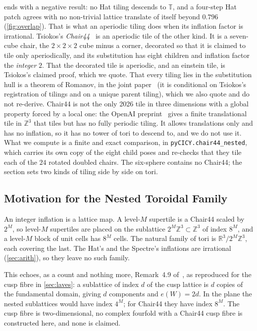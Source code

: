 \documentclass[11pt,a4paper]{article}
\newcommand{\ZZ}{\mathbb{Z}}
\newcommand{\RR}{\mathbb{R}}
\newcommand{\TT}{\mathbb{T}}
\theoremstyle{plain}
\theoremstyle{definition}
\begin{document}
 ends with a negative result: no Hat tiling descends to $\TT$,
and a four-step Hat patch agrees with no non-trivial lattice translate of itself
beyond $0.796$ (\cref{fig:overlap}). That is what an aperiodic tiling does when
its inflation factor is irrational. Tsiokos's \emph{Chair44}~\cite{Tsiokos1}
is an aperiodic tile of the other kind. It is a seven-cube chair, the
$2\times2\times2$ cube minus a corner, decorated so that it is claimed to tile only
aperiodically, and its substitution has eight children and inflation factor the
\emph{integer} $2$. That the decorated tile is aperiodic, and an einstein tile, is
Tsiokos's claimed proof, which we quote. That every tiling lies in the substitution hull
is a theorem of Romanov, in the joint paper~\cite{HartshornRomanov} (it is conditional on
Tsiokos's registration of tilings and on a unique parent tiling), which we also quote and do
not re-derive. Chair44 is not the only 2026 tile in three dimensions with a global property forced by a local one:
the OpenAI preprint~\cite{OAI155} gives a finite translational tile in $\ZZ^3$ that tiles but has no fully periodic tiling.
It allows translations only and has no inflation, so it has no tower of tori to descend to, and we do not use it. What we compute is a finite and exact comparison, in \texttt{pyCICY.chair44\_nested}, which carries its own copy of the
eight child poses and re-checks that they tile each of the $24$ rotated doubled
chairs. The six-sphere contains no Chair44; the section sets two kinds of tiling
side by side on tori.

\subsection{Motivation for the Nested Toroidal Family}
\label{sec:chair-nested}

An integer inflation is a lattice map. A level-$M$ supertile is a Chair44 scaled by
$2^M$, so level-$M$ supertiles are placed on the sublattice $2^M\ZZ^3\subset\ZZ^3$
of index $8^M$, and a level-$M$ block of unit cells has $8^M$ cells. The natural
family of tori is $\RR^3/2^M\ZZ^3$, each covering the last. The Hat's and the
Spectre's inflations are irrational (\cref{sec:arith}), so they leave no such
family.

This echoes, as a count and nothing more, Remark~4.9 of~\cite{Alpoge}, as reproduced
for the cusp fibre in \cref{sec:laves}: a sublattice of index $d$ of the cusp lattice is
$d$ copies of the fundamental domain, giving $d$ components and $e(W)=2d$. In the plane
the nested sublattices would have index $4^M$; for Chair44 they have index $8^M$. The cusp
fibre is two-dimensional, no complex fourfold with a Chair44 cusp fibre is constructed
here, and none is claimed.
\end{document}
